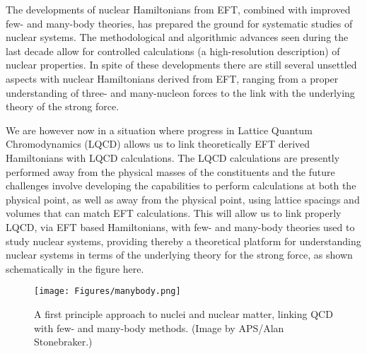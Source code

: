 \documentclass[10pt]{article}
\begin{document}
The developments of nuclear Hamiltonians from EFT, combined with
improved few- and many-body theories, has prepared the ground for
systematic studies of nuclear systems. The methodological and
algorithmic advances seen during the last decade allow for controlled
calculations (a high-resolution description) of nuclear properties. In
spite of these developments there are still several unsettled aspects
with nuclear Hamiltonians derived from EFT, ranging from a proper
understanding of three- and many-nucleon forces to the link with the
underlying theory of the strong force.

We are however now in a situation where progress in Lattice Quantum
Chromodynamics (LQCD) \cite{lqcd1,lqcd2} allows us to link
theoretically EFT derived Hamiltonians with LQCD calculations. The
LQCD calculations are presently performed away from the physical
masses of the constituents and the future challenges involve
developing the capabilities to perform calculations at both the
physical point, as well as away from the physical point, using lattice
spacings and volumes that can match EFT calculations.  This will allow
us to link properly LQCD, via EFT based Hamiltonians, with few- and
many-body theories used to study nuclear systems, providing thereby a
theoretical platform for understanding nuclear systems in terms of the
underlying theory for the strong force, as shown schematically in the
figure here.

\begin{figure}[hbtp]
\begin{center}
  \texttt{[image: Figures/manybody.png]}
\end{center}
\caption{A first principle approach to nuclei and nuclear matter, linking QCD with few- and many-body methods. (Image by APS/Alan Stonebraker.)}
\end{figure}
\end{document}
